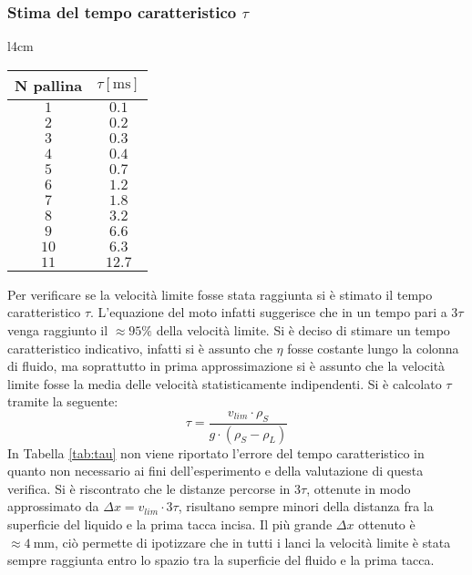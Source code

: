 \documentclass[a4paper,11pt,oneside]{article}
\begin{document}
\subsubsection*{Stima del tempo caratteristico $\tau$}
\begin{wraptable}{l}{4cm}
\centering
    \begin{tabular}{|c|c|}
        \hline
        \textbf{N pallina} & \textbf{$\tau [\si{\milli\second}]$} \\ \hline
        \rowcolor[rgb]{0.85,0.85,0.85}$1$ & $0.1$ \\ \hline
        $2$ & $0.2$ \\ \hline
        \rowcolor[rgb]{0.85,0.85,0.85}$3$ & $0.3$ \\ \hline
        $4$ & $0.4$ \\ \hline
        \rowcolor[rgb]{0.85,0.85,0.85}$5$ & $0.7$ \\ \hline
        $6$ & $1.2$ \\ \hline
        \rowcolor[rgb]{0.85,0.85,0.85}$7$ & $1.8$ \\ \hline
        $8$ & $3.2$ \\ \hline
        \rowcolor[rgb]{0.85,0.85,0.85}$9$ & $6.6$ \\ \hline
        $10$ & $6.3$ \\ \hline
        \rowcolor[rgb]{0.85,0.85,0.85}$11$ & $12.7$ \\ \hline
    \end{tabular}
    \caption{Tempo $\tau$}
    \label{tab:tau}
    \vspace{0.5cm}
\end{wraptable}

Per verificare se la velocità limite fosse stata raggiunta si è stimato il tempo caratteristico $\tau$. L'equazione del moto infatti suggerisce che in un tempo pari a $3\tau$ venga raggiunto il $\approx 95\%$ della velocità limite.
Si è deciso di stimare un tempo caratteristico indicativo, infatti si è assunto che $\eta$ fosse costante lungo la colonna di fluido, ma soprattutto in prima approssimazione si è assunto che la velocità limite fosse la media delle velocità statisticamente indipendenti.
Si è calcolato $\tau$ tramite la seguente:
\begin{equation*}
    \tau = \frac{v_{lim} \cdot \rho_{S}}{g \cdot (\rho_{S} - \rho_{L})}
\end{equation*}
In Tabella \ref{tab:tau} non viene riportato l'errore del tempo caratteristico in quanto non necessario ai fini dell'esperimento e della valutazione di questa verifica. Si è riscontrato che le distanze percorse in $3\tau$, ottenute in modo approssimato da $\Delta x=v_{lim} \cdot 3 \tau$, risultano sempre minori della distanza fra la superficie del liquido e la prima tacca incisa. Il più grande $\Delta x$ ottenuto è $\approx \SI{4}{\milli\metre}$, ciò permette di ipotizzare che in tutti i lanci la velocità limite è stata sempre raggiunta entro lo spazio tra la superficie del fluido e la prima tacca.%
\end{document}
